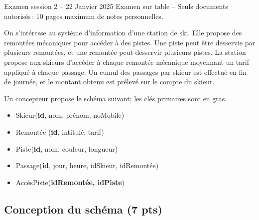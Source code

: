 %
{Examen session 2 -- 22 Janvier 2025}%
{Examen sur table -- Seuls documents autorisés\,: 10 pages maximum de notes personnelles.}%


On s'intéresse au système d'information d'une station de ski. Elle propose
des remontées mécaniques pour accéder à des pistes. Une piste
peut être desservie par plusieurs remontées, et une remontée peut desservir 
plusieurs pistes.
La station propose
aux skieurs d'accéder à chaque remontée mécanique moyennant un tarif 
appliqué à chaque passage. 
Un cumul des passages par skieur est effectué
                 en fin de journée, et le montant obtenu
                est prélevé sur le compte du skieur.

Un concepteur propose le schéma suivant; les clés primaires sont en gras.

\begin{itemize}
\item Skieur(\textbf{id}, nom, prénom, noMobile)
\item Remontée (\textbf{id}, intitulé, tarif)
\item Piste(\textbf{id}, nom, couleur, longueur)
\item Passage(\textbf{id}, jour, heure, idSkieur, idRemontée)
\item AccèsPiste(\textbf{idRemontée, idPiste})

\end{itemize}

\subsection*{Conception du schéma (7 pts)}

